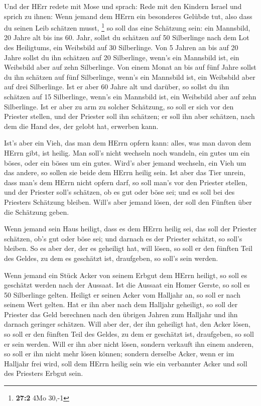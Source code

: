  Und der HErr redete mit Mose und sprach: 
Rede mit den Kindern Israel und sprich zu ihnen: Wenn jemand dem HErrn
ein besonderes Gelübde tut, also dass du seinen Leib schätzen musst,
\footnote{\textbf{27:2} 4Mo 30,-1}  so soll das eine
Schätzung sein: ein Mannsbild, 20 Jahre alt bis ins 60. Jahr, sollst du
schätzen auf 50 Silberlinge nach dem Lot des Heiligtums, 
ein Weibsbild auf 30 Silberlinge.  Von 5 Jahren an bis auf
20 Jahre sollst du ihn schätzen auf 20 Silberlinge, wenn's ein Mannsbild
ist, ein Weibsbild aber auf zehn Silberlinge.  Von einem
Monat an bis auf fünf Jahre sollst du ihn schätzen auf fünf Silberlinge,
wenn's ein Mannsbild ist, ein Weibsbild aber auf drei Silberlinge.
 Ist er aber 60 Jahre alt und darüber, so sollst du ihn
schätzen auf 15 Silberlinge, wenn's ein Mannsbild ist, ein Weibsbild
aber auf zehn Silberlinge.  Ist er aber zu arm zu solcher
Schätzung, so soll er sich vor den Priester stellen, und der Priester
soll ihn schätzen; er soll ihn aber schätzen, nach dem die Hand des, der
gelobt hat, erwerben kann.

 Ist's aber ein Vieh, das man dem HErrn opfern kann:
alles, was man davon dem HErrn gibt, ist heilig.  Man
soll's nicht wechseln noch wandeln, ein gutes um ein böses, oder ein
böses um ein gutes. Wird's aber jemand wechseln, ein Vieh um das andere,
so sollen sie beide dem HErrn heilig sein.  Ist aber das
Tier unrein, dass man's dem HErrn nicht opfern darf, so soll man's vor
den Priester stellen,  und der Priester soll's schätzen,
ob es gut oder böse sei; und es soll bei des Priesters Schätzung
bleiben.  Will's aber jemand lösen, der soll den Fünften
über die Schätzung geben.

 Wenn jemand sein Haus heiligt, dass es dem HErrn heilig
sei, das soll der Priester schätzen, ob's gut oder böse sei; und darnach
es der Priester schätzt, so soll's bleiben.  So es aber
der, der es geheiligt hat, will lösen, so soll er den fünften Teil des
Geldes, zu dem es geschätzt ist, draufgeben, so soll's sein werden.

 Wenn jemand ein Stück Acker von seinem Erbgut dem HErrn
heiligt, so soll es geschätzt werden nach der Aussaat. Ist die Aussaat
ein Homer Gerste, so soll es 50 Silberlinge gelten. 
Heiligt er seinen Acker vom Halljahr an, so soll er nach seinem Wert
gelten.  Hat er ihn aber nach dem Halljahr geheiligt, so
soll der Priester das Geld berechnen nach den übrigen Jahren zum
Halljahr und ihn darnach geringer schätzen.  Will aber
der, der ihn geheiligt hat, den Acker lösen, so soll er den fünften Teil
des Geldes, zu dem er geschätzt ist, draufgeben, so soll er sein werden.
 Will er ihn aber nicht lösen, sondern verkauft ihn einem
anderen, so soll er ihn nicht mehr lösen können;  sondern
derselbe Acker, wenn er im Halljahr frei wird, soll dem HErrn heilig
sein wie ein verbannter Acker und soll des Priesters Erbgut sein.

